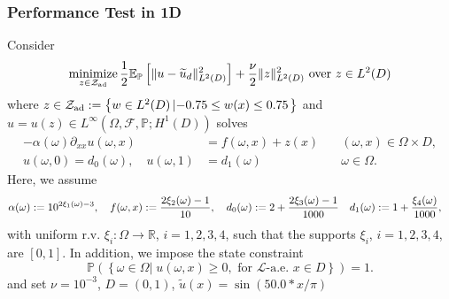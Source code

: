 \documentclass[aspectratio=169,xcolor=dvipsnames,11pt]{beamer}
\newcommand{\setZ}{\mathcal{Z}}
\begin{document}
\begin{footnotesize}
\begin{frame}\frametitle{Performance Test in 1D}
\vspace{-1ex}
\begin{example}
Consider
\begin{equation*}%
  \operatorname*{minimize}_{z\in\setZ_{\rm ad}} 
     \frac{1}{2} \mathbb E_{\mathbb P}\left[ \| u- \widetilde{u}_{d} \|^2_{L^2(D)}\right]
    +\frac{\nu}{2} \| z \|^2_{L^2(D)}\text{ over } z \in L^2(D)
\end{equation*}
where $z \in 
\setZ_{\rm ad} := \left\{w \in L^2(D) \left| -0.75 \le w(x) \le 0.75\right.\right\}
$
 and 
 $u=u(z)\in L^{\infty}(\Omega, \mathcal{F}, \mathbb P;H^1(D))$ solves 
\begin{subequations} \label{eq:elliptic_equation}
\begin{align}
  -\alpha(\omega) \partial_{xx} u(\omega,x) &= f(\omega,x) + z(x) 
           \quad &(\omega,x)\in\Omega\times D, \\
     u(\omega,0) = d_0(\omega),\quad u(\omega,1) &= d_1(\omega) \quad &\omega\in\Omega. 
\end{align}
\end{subequations}
Here, we assume
\[
\aligned
\alpha(\omega) &:= 10^{2\xi_1(\omega)-3},\quad f(\omega,x) := \frac{2\xi_2(\omega)-1}{10},\quad
d_0(\omega) := 2+\frac{2\xi_3(\omega)-1}{1000}\quad
d_1(\omega) :=  1+ \frac{\xi_4(\omega)}{1000},
\endaligned
\]
with uniform r.v. $\xi_i :\Omega \to \mathbb R$, $i=1,2,3,4$, such that the supports $\xi_i$, $i=1,2,3,4$, are $[0,1]$. 
In addition, we impose the state constraint
\[
\mathbb P(\left\{\omega \in \Omega \left|\; u(\omega,x) \ge 0, \text{ for } \mathcal{L}\text{-a.e. } x \in D \right.\right\}) = 1.
\]
and
set $\nu = 10^{-3}$, 
$D = (0,1)$, $\widetilde{u}(x) = \sin(50.0*x/\pi)$
\end{example}



\end{frame}
\end{footnotesize}
\end{document}
